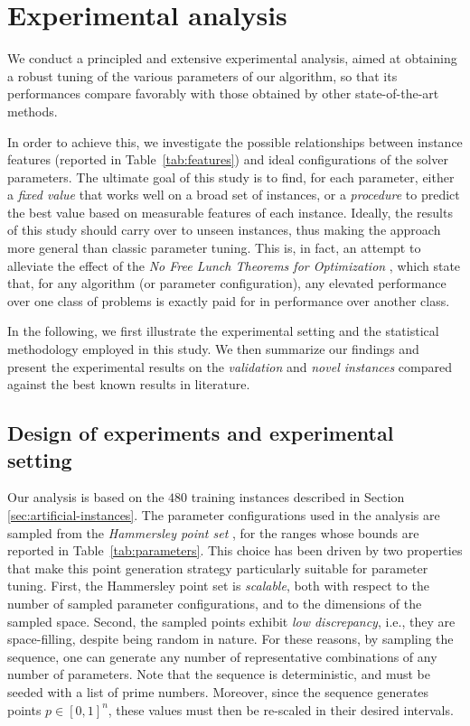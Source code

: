 \documentclass[authoryear,12pt]{article}
\begin{document}
\section{Experimental analysis}
\label{sec:experimental}

We conduct a principled and extensive experimental analysis, aimed at obtaining
a robust tuning of the various parameters of our algorithm, so that its
performances compare favorably with those obtained by other state-of-the-art
methods.

In order to achieve this, we investigate the possible relationships between
instance features (reported in Table~\ref{tab:features}) and ideal
configurations of the solver parameters. The ultimate goal of this study is to
find, for each parameter, either a \emph{fixed value} that works well on a broad
set of instances, or a \emph{procedure} to predict the best value based on
measurable features of each instance. Ideally, the results of this study should
carry over to unseen instances, thus making the approach more general than
classic parameter tuning.  This is, in fact, an attempt to alleviate the effect
of the \emph{No Free Lunch Theorems for Optimization} \citep{WoMa97}, which
state that, for any algorithm (or parameter configuration), any elevated
performance over one class of problems is exactly paid for in performance over
another class.

In the following, we first illustrate the experimental setting and the
statistical methodology employed in this study. We then summarize our findings
and present the experimental results on the \emph{validation} and \emph{novel
instances} compared against the best known results in literature.

\subsection{Design of experiments and experimental setting}
\label{sec:tuning}

Our analysis is based on the $480$ training instances described in Section
\ref{sec:artificial-instances}. The parameter configurations used in the
analysis are sampled from the \emph{Hammersley point set} \citep{HaHW65}, for
the ranges whose bounds are reported in Table~\ref{tab:parameters}. This choice
has been driven by two properties that make this point generation strategy
particularly suitable for parameter tuning.  First, the Hammersley point set is
\emph{scalable}, both with respect to the number of sampled parameter
configurations, and to the dimensions of the sampled space. Second, the sampled
points exhibit \emph{low discrepancy}, i.e., they are space-filling, despite
being random in nature. For these reasons, by sampling the sequence, one can
generate any number of representative combinations of any number of parameters.
Note that the sequence is deterministic, and must be seeded with a list of prime
numbers. Moreover, since the sequence generates points $p \in [0,1]^{n}$, these
values must then be re-scaled in their desired intervals.
\end{document}
